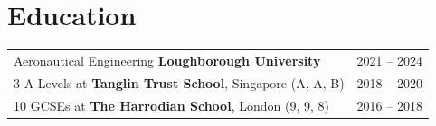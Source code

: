 \documentclass[a4paper,12pt]{article}
\begin{document}

\section{Education}
\begin{tabularx}{\linewidth}{@{}l X@{}}
	Aeronautical Engineering \textbf{Loughborough University}        & \hfill 2021 -- 2024 \\
	3 A Levels at \textbf{Tanglin Trust School}, Singapore (A, A, B) & \hfill 2018 -- 2020 \\
	10 GCSEs at \textbf{The Harrodian School}, London (9, 9, 8)      & \hfill 2016 -- 2018 \\
\end{tabularx}

\end{document}
